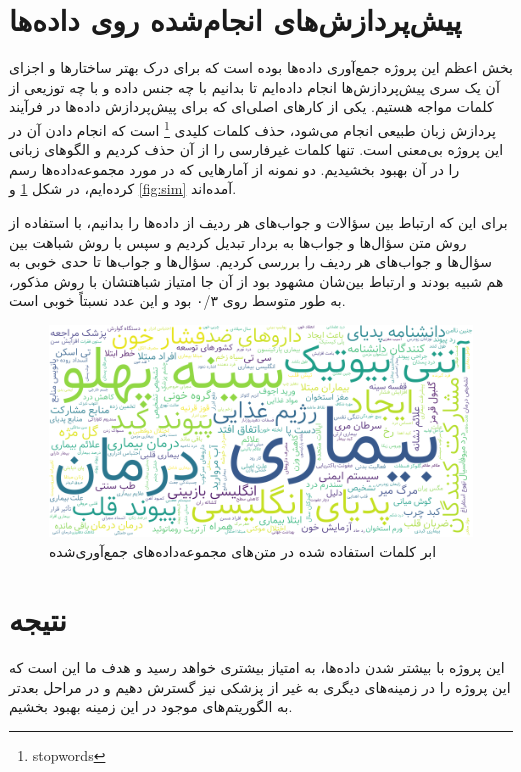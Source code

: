 \documentclass{CCI2020}
\begin{document}






\section{پیش‌پردازش‌های انجام‌شده روی داده‌ها}
بخش اعظم این پروژه جمع‌آوری داده‌ها بوده است که برای درک بهتر ساختارها و اجزای آن یک سری پیش‌پردازش‌ها انجام داده‌ایم تا بدانیم با چه جنس داده و با چه توزیعی از کلمات مواجه هستیم. یکی از کارهای اصلی‌ای که برای پیش‌پردازش داده‌ها در فرآیند پردازش زبان طبیعی انجام می‌شود، حذف کلمات کلیدی \footnote{stopwords} است که انجام دادن آن در این پروژه بی‌معنی است. تنها کلمات غیرفارسی را از آن حذف کردیم و الگوهای زبانی را در آن بهبود بخشیدیم. دو نمونه از آمارهایی که در مورد مجموعه‌داده‌ها رسم کرده‌ایم، در شکل \ref{fig:wc} و \ref{fig:sim} آمده‌اند.

برای این که ارتباط بین سؤالات و جواب‌های هر ردیف از داده‌ها را بدانیم، با استفاده از روش  متن سؤال‌ها و جواب‌ها به بردار تبدیل کردیم و سپس با روش  شباهت بین سؤال‌ها و جواب‌های هر ردیف را بررسی کردیم. سؤال‌ها و جواب‌ها تا حدی خوبی به هم شبیه بودند و ارتباط بین‌شان مشهود بود از آن جا امتیاز شباهتشان با روش مذکور، به طور متوسط روی ۰/۳ بود و این عدد نسبتاً خوبی است.


\begin{figure}[H]
    \centering
    \includegraphics[width=\linewidth]{images/wordcloud.png}
    \caption{ابر کلمات استفاده شده در متن‌های مجموعه‌داده‌های جمع‌آوری‌شده}
    \label{fig:wc}
\end{figure}

\section{نتیجه}
این پروژه با بیشتر شدن داده‌ها، به امتیاز بیشتری خواهد رسید و هدف ما این است که این پروژه را در زمینه‌های دیگری به غیر از پزشکی نیز گسترش دهیم و در مراحل بعدتر به الگوریتم‌های موجود در این زمینه بهبود بخشیم.

%


\end{document}
